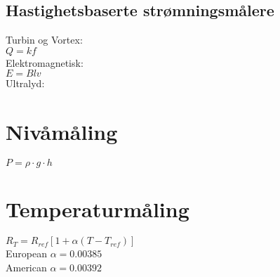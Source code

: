 \subsection*{Hastighetsbaserte strømningsmålere}
Turbin og Vortex:\\
$Q=kf$\\
Elektromagnetisk:\\
$E=Blv$\\
Ultralyd:\\
 
\section{Nivåmåling}

$P = \rho \cdot g \cdot h $\\
\section{Temperaturmåling}
$R_T = R_{ref}[1 + \alpha(T - T_{ref})]$\\
European $\alpha=0.00385$\\
American $\alpha=0.00392$\\
